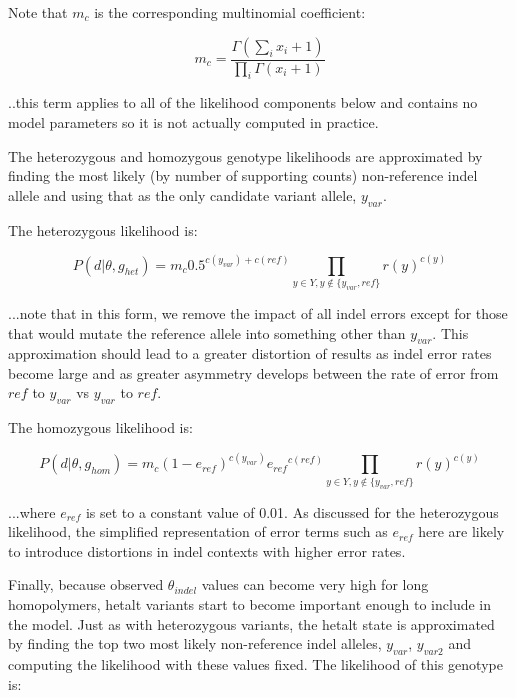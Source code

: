 \documentclass{article}
\begin{document}
Note that $m_c$ is the corresponding multinomial coefficient:

\begin{equation*}
m_c = \frac{\Gamma(\sum_{i}{x_i + 1})}{\prod_{i}{\Gamma(x_i+1)}}
\end{equation*}

..this term applies to all of the likelihood components below and contains no model parameters so it is not actually computed in practice.

The heterozygous and homozygous genotype likelihoods are approximated by finding the most likely (by number of supporting counts) non-reference indel allele and using that as the only candidate variant allele, $y_{var}$.

The heterozygous likelihood is:

\begin{equation*}
P (d \vert \theta, g_{het}) = m_c 0.5^{c(y_{var}) + c(ref)} \prod_{y \in Y, y \not\in \{y_{var},ref\}} r(y)^{c(y)}
\end{equation*}

...note that in this form, we remove the impact of all indel errors except for those that would mutate the reference allele into something other than $y_{var}$. This approximation should lead to a greater distortion of results as indel error rates become large and as greater asymmetry develops between the rate of error from $ref$ to $y_{var}$ vs $y_{var}$ to $ref$.

The homozygous likelihood is:

\begin{equation*}
P (d \vert \theta, g_{hom}) = m_c (1-e_{ref})^{c(y_{var})} {e_{ref}}^{c(ref)} \prod_{y \in Y, y \not\in \{y_{var},ref\}} r(y)^{c(y)}
\end{equation*}

...where $e_{ref}$ is set to a constant value of 0.01. As discussed for the heterozygous likelihood, the simplified representation of error terms such as $e_{ref}$ here are likely to introduce distortions in indel contexts with higher error rates.

Finally, because observed $\theta_{indel}$ values can become very high for long homopolymers, hetalt variants start to become important enough to include in the model. Just as with heterozygous variants, the hetalt state is approximated by finding the top two most likely non-reference indel alleles, $y_{var}$, $y_{var2}$ and computing the likelihood with these values fixed. The likelihood of this genotype is:
\end{document}
